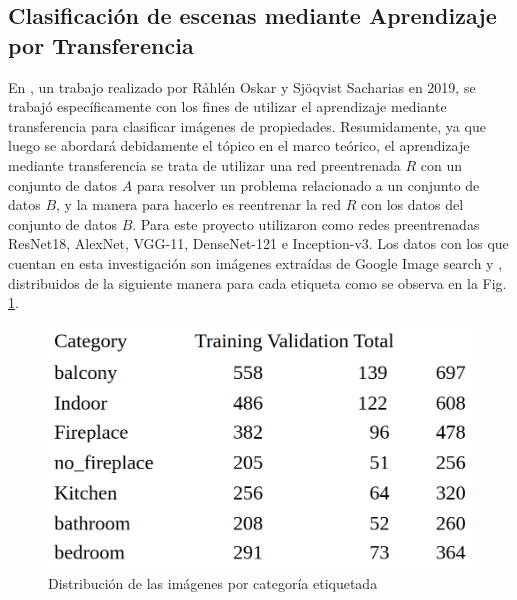 \subsection{Clasificación de escenas mediante Aprendizaje por Transferencia} \label{ssec:transfer_learning}
En \cite{raahlen2019image}, un trabajo realizado por R{\aa}hl{\'e}n Oskar y Sj{\"o}qvist Sacharias en 2019, se trabajó específicamente con los fines de utilizar el aprendizaje mediante transferencia para clasificar imágenes de propiedades.
Resumidamente, ya que luego se abordará debidamente el tópico en el marco teórico, el aprendizaje mediante transferencia se trata de utilizar una red preentrenada \(R\) con un conjunto de datos \(A\) para resolver un problema relacionado a un conjunto de datos \(B\), y la manera para hacerlo es reentrenar la red \(R\) con los datos del conjunto de datos \(B\). Para este proyecto utilizaron como redes preentrenadas ResNet18, AlexNet, VGG-11, DenseNet-121 e Inception-v3.
Los datos con los que cuentan en esta investigación son imágenes extraídas de Google Image search y \cite{hemnet}, distribuidos de la siguiente manera para cada etiqueta como se observa en la Fig. \ref{fig:transferlearningdataset}.
\begin{figure}[h!]
	\centering
	\includegraphics[width=0.7\linewidth]{images/transfer_learning_dataset}
	\caption[Distribución de las imágenes por categoría etiquetada]{Distribución de las imágenes por categoría etiquetada}
	\label{fig:transferlearningdataset}
\end{figure}


